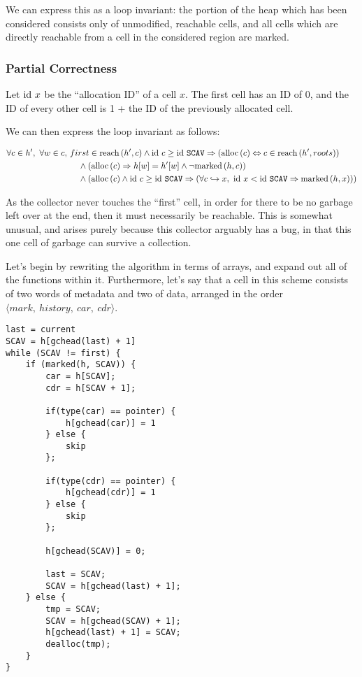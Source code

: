 We can express this as a \gls{loop invariant}: the portion of the
\gls{heap} which has been considered consists only of unmodified,
reachable \glspl{cell}, and all \glspl{cell} which are directly
reachable from a \gls{cell} in the considered region are marked.

\subsubsection{Partial Correctness}

Let $\mathrm{id}~x$ be the ``allocation ID'' of a cell $x$. The first cell has
an ID of 0, and the ID of every other cell is 1 + the ID of the
previously allocated cell.

We can then express the \gls{loop invariant} as follows:

\begin{align*}
  \forall c \in h',\ \forall w \in c,\ &first \in \mathrm{reach}\left(h', c\right) \land
  \mathrm{id}~c \geq \mathrm{id}~\mathtt{SCAV} \Rightarrow (\mathrm{alloc}\left(c\right) \Leftrightarrow c \in
  \mathrm{reach}\left(h', roots\right))\\
  &\quad\land (\mathrm{alloc}\left(c\right) \Rightarrow h[w] = h'[w] \land \lnot
  \mathrm{marked}\left(h, c\right))\\
  &\quad\land (\mathrm{alloc}\left(c\right) \land \mathrm{id}~c \geq \mathrm{id}~\mathtt{SCAV} \Rightarrow
  (\forall c \hookrightarrow x,\ \mathrm{id}~x < \mathrm{id}~\mathtt{SCAV} \Rightarrow
  \mathrm{marked}\left(h, x\right)))
\end{align*}

As the \gls{collector} never touches the ``first'' \gls{cell}, in
order for there to be no \gls{garbage} left over at the end, then it
must necessarily be reachable. This is somewhat unusual, and arises
purely because this \gls{collector} arguably has a bug, in that this
one \gls{cell} of \gls{garbage} can survive a collection.

Let's begin by rewriting the algorithm in terms of arrays, and expand
out all of the functions within it. Furthermore, let's say that a cell
in this scheme consists of two words of metadata and two of data,
arranged in the order $\langle mark,\ history,\ car,\ cdr \rangle$.

\begin{lstlisting}
last = current
SCAV = h[gchead(last) + 1]
while (SCAV != first) {
    if (marked(h, SCAV)) {
        car = h[SCAV];
        cdr = h[SCAV + 1];

        if(type(car) == pointer) {
            h[gchead(car)] = 1
        } else {
            skip
        };

        if(type(cdr) == pointer) {
            h[gchead(cdr)] = 1
        } else {
            skip
        };

        h[gchead(SCAV)] = 0;

        last = SCAV;
        SCAV = h[gchead(last) + 1];
    } else {
        tmp = SCAV;
        SCAV = h[gchead(SCAV) + 1];
        h[gchead(last) + 1] = SCAV;
        dealloc(tmp);
    }
}
\end{lstlisting}

